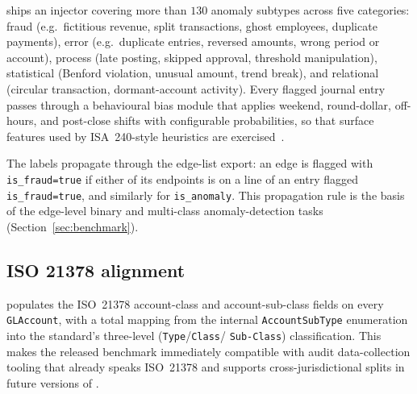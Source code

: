 \system{} ships an injector covering more than $130$ anomaly
subtypes across five categories: fraud (e.g.\ fictitious revenue,
split transactions, ghost employees, duplicate payments), error
(e.g.\ duplicate entries, reversed amounts, wrong period or
account), process (late posting, skipped approval, threshold
manipulation), statistical (Benford violation, unusual amount,
trend break), and relational (circular transaction, dormant-account
activity).  Every flagged journal entry passes through a behavioural
bias module that applies weekend, round-dollar, off-hours, and
post-close shifts with configurable probabilities, so that surface
features used by ISA~240-style heuristics are
exercised~\citep{isa240}.

The labels propagate through the edge-list export: an edge is
flagged with \texttt{is\_fraud=true} if either of its endpoints is on
a line of an entry flagged \texttt{is\_fraud=true}, and similarly for
\texttt{is\_anomaly}.  This propagation rule is the basis of the
edge-level binary and multi-class anomaly-detection tasks
(Section~\ref{sec:benchmark}).

\subsection{ISO 21378 alignment}
\label{sec:datasynth:iso}

\system{} populates the ISO~21378 \citep{iso21378} account-class and
account-sub-class fields on every \texttt{GLAccount}, with a total
mapping from the internal \texttt{AccountSubType} enumeration into
the standard's three-level (\texttt{Type}/\texttt{Class}/
\texttt{Sub-Class}) classification.  This makes the released
benchmark immediately compatible with audit data-collection tooling
that already speaks ISO~21378 and supports cross-jurisdictional
splits in future versions of \bench{}.
